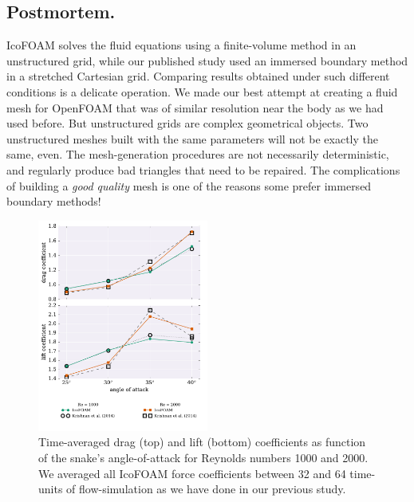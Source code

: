\documentclass[9pt,twocolumn,twoside]{article}
\begin{document}
\subsection*{Postmortem.} 
IcoFOAM solves the fluid equations using a finite-volume method in an unstructured grid, while our published study used an immersed boundary method in a stretched Cartesian grid. 
Comparing results obtained under such different conditions is a delicate operation. 
We made our best attempt at creating a fluid mesh for OpenFOAM that was of similar resolution near the body as we had used before. 
But unstructured grids are complex geometrical objects. 
Two unstructured meshes built with the same parameters will not be exactly the same, even. 
The mesh-generation procedures are not necessarily deterministic, and regularly produce bad triangles that need to be repaired. 
The complications of building a \textit{good quality} mesh is one of the reasons some prefer immersed boundary methods!


\begin{figure}[t]
\centering
\includegraphics[width=0.5\textwidth]{./figures/openfoam_forceCoefficientsVsAoA.pdf}
\caption{
Time-averaged drag (top) and lift (bottom) coefficients as function of the snake's angle-of-attack for Reynolds numbers 1000 and 2000.
We averaged all IcoFOAM force coefficients between 32 and 64 time-units of flow-simulation as we have done in our previous study.
}
\label{figure3}
\end{figure}
\end{document}
